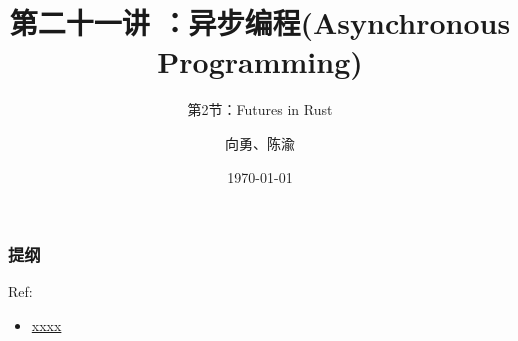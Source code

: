 


\title[第21讲]{第二十一讲 ：异步编程(Asynchronous Programming)} %
\subtitle{第2节：Futures in Rust}
\author{向勇、陈渝} %
\date{\today} %



\begin{frame}
\titlepage %
\end{frame}

\begin{frame}
\frametitle{提纲} %
\tableofcontents %

Ref:
    \begin{itemize}
        \item \href{}{xxxx}
    \end{itemize}

\end{frame}
